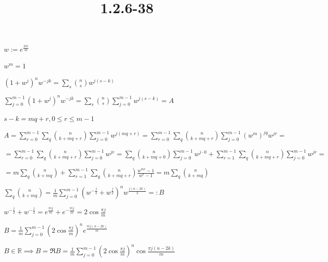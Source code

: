 \documentclass{article}
\title{1.2.6-38}
\begin{document}
\maketitle

\( w := e^{\frac{2 \pi i}{m}} \)

\( w^m = 1 \)

\( (1+w^j)^n w^{-jk} = \sum_{s} \binom{n}{s} w^{j(s-k)} \)

\( \sum_{j=0}^{m-1} (1+w^j)^n w^{-jk} = \sum_{s} \binom{n}{s} \sum_{j=0}^{m-1} w^{j(s-k)} = A \)

\( s-k = mq + r, 0 \leq r \leq m - 1 \)

\( A = \sum_{r=0}^{m-1} \sum_{q} \binom{n}{k + mq + r} \sum_{j=0}^{m-1} w^{j(mq+r)} = \sum_{r=0}^{m-1} \sum_{q} \binom{n}{k + mq + r} \sum_{j=0}^{m-1} (w^m)^{jq}w^{jr} = \)

\( = \sum_{r=0}^{m-1} \sum_{q} \binom{n}{k + mq + r} \sum_{j=0}^{m-1} w^{jr} = \sum_{q} \binom{n}{k + mq + 0} \sum_{j=0}^{m-1} w^{j \cdot 0} + \sum_{r=1}^{m-1} \sum_{q} \binom{n}{k + mq + r} \sum_{j=0}^{m-1} w^{jr} = \)

\( = m \sum_{q} \binom{n}{k + mq} + \sum_{r=1}^{m-1} \sum_{q} \binom{n}{k + mq + r} \frac{w^{mr} - 1}{w^r - 1} = m \sum_{q} \binom{n}{k + mq} \)

\( \sum_q \binom{n}{k+mq} = \frac{1}{m} \sum_{j=0}^{m-1} (w^{-\frac{j}{2}}+w^{\frac{j}{2}})^n w^{\frac{j(n-2k)}{2}} =: B \)

\( w^{-\frac{j}{2}} + w^{-\frac{j}{2}} = e^{\frac{\pi i j}{m}} + e^{-\frac{\pi i j}{m}} = 2 \cos \frac{\pi j}{m} \)

\( B = \frac{1}{m} \sum_{j=0}^{m-1} (2 \cos \frac{\pi j}{m})^n e^{\frac{\pi i j(n-2k)}{m}} \)

\( B \in \mathbb{R} \implies B = \Re B = \frac{1}{m} \sum_{j=0}^{m-1} (2 \cos \frac{\pi j}{m})^n \cos \frac{\pi j(n-2k)}{m} \)
\end{document}
